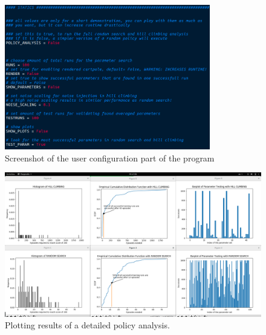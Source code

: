 \documentclass[a4paper, 11pt]{article}
\begin{document}
\begin{figure}[hbpt!]
 \centering
 \includegraphics[width=0.8\textwidth]{interface}
 \caption{Screenshot of the user configuration part of the program}
 \label{fig:interface}
\end{figure}

\begin{figure}[hbpt!]
	\centering
	\includegraphics[width=\textwidth, height=0.75\textwidth]{1000_runs}
	\caption{Plotting results of a detailed policy analysis.}
	\label{fig:plots}
\end{figure}
\end{document}
